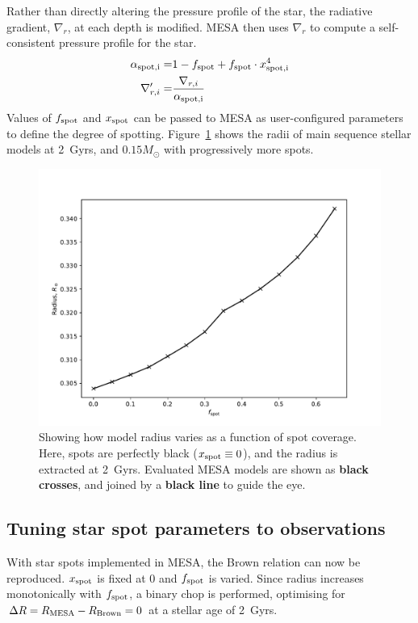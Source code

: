 Rather than directly altering the pressure profile of the star, the radiative gradient, $\nabla_r$, at each depth is modified. MESA then uses $\nabla_r$ to compute a self-consistent pressure profile for the star.
\begin{align}
    \alpha_{\rm spot, i} =& 1 - f_{\rm spot} + f_{\rm spot} \cdot x_{\rm spot, i}^4 \\
    \nabla_{r,i}' =& \frac{\nabla_{r,i}}{\alpha_{\rm spot, i}}
\end{align}
Values of $f_{\rm spot}$ and $x_{\rm spot}$ can be passed to MESA as user-configured parameters to define the degree of spotting. Figure~\ref{fig:modelling:spotted model radii at 2Gyrs} shows the radii of main sequence stellar models at 2~Gyrs, and $0.15 M_\odot$ with progressively more spots.
\begin{figure}
    \centering
    \includegraphics[width=\textwidth]{figures/modelling/spotted_model_radii_at_2gyrs.pdf}
    \caption{Showing how model radius varies as a function of spot coverage. Here, spots are perfectly black ($x_{\rm spot} \equiv 0$), and the radius is extracted at 2~Gyrs. Evaluated MESA models are shown as {\bf black crosses}, and joined by a {\bf black line} to guide the eye.}
    \label{fig:modelling:spotted model radii at 2Gyrs}
\end{figure}


\subsection{Tuning star spot parameters to observations}
\label{sect:modelling:tuning star spots to observations}
With star spots implemented in MESA, the Brown relation can now be reproduced.
$x_{\rm spot}$ is fixed at 0 and $f_{\rm spot}$ is varied.
Since radius increases monotonically with $f_{\rm spot}$, a binary chop is performed, optimising for $\Delta R = R_{\rm MESA} - R_{\rm Brown} = 0$ at a stellar age of 2~Gyrs.

